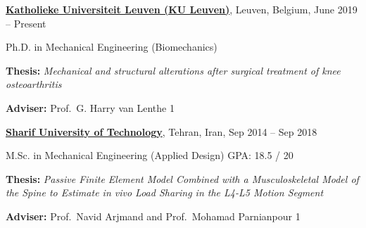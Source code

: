 \documentclass[8pt]{article}
\newcommand{\halfblankline}{\quad\vspace{-0.5\baselineskip}\pagebreak[3]}
\def\longversion{1}  %
\begin{document}
\href{https://www.kuleuven.be/english/kuleuven}{\textbf{Katholieke Universiteit Leuven (KU Leuven)}}, Leuven, Belgium, {June 2019 -- Present}
\begin{innerlist}
\item[] Ph.D. in Mechanical Engineering (Biomechanics) \quad %
        \begin{innerlist}
        \item[] \textbf{Thesis:} \emph{Mechanical and structural alterations after surgical treatment of knee osteoarthritis}
        \item[] \textbf{Adviser:} Prof.~G. Harry van Lenthe
        \if\longversion1
        \fi
        \end{innerlist}

\end{innerlist}

\halfblankline

\href{http://www.en.sharif.edu/}{\textbf{Sharif University of Technology}}, Tehran, Iran, {Sep 2014 -- Sep 2018}
\begin{innerlist}
	\item[] M.Sc. in Mechanical Engineering (Applied Design) \quad  GPA: 18.5 / 20
	\begin{innerlist}
		\item[] \textbf{Thesis:} \emph{Passive Finite Element Model Combined with a Musculoskeletal Model of the Spine to Estimate in vivo Load Sharing in the
L4-L5 Motion Segment}
		\item[] \textbf{Adviser:} Prof.~Navid Arjmand and Prof.~Mohamad Parnianpour
		\if\longversion1
  
		\fi
	\end{innerlist}
	
\end{innerlist}

\halfblankline
\end{document}
